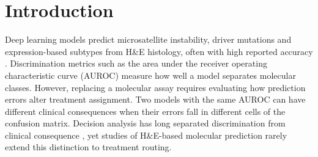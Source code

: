 \documentclass[a4paper,10pt,twocolumn]{extarticle}
\begin{document}

\section{Introduction}

Deep learning models predict microsatellite instability, driver mutations and expression-based subtypes from H\&E histology, often with high reported accuracy \cite{kather2019,coudray2018,kather2020}. Discrimination metrics such as the area under the receiver operating characteristic curve (AUROC) measure how well a model separates molecular classes. However, replacing a molecular assay requires evaluating how prediction errors alter treatment assignment. Two models with the same AUROC can have different clinical consequences when their errors fall in different cells of the confusion matrix. Decision analysis has long separated discrimination from clinical consequence \cite{vickers2006}, yet studies of H\&E-based molecular prediction rarely extend this distinction to treatment routing.
\end{document}

